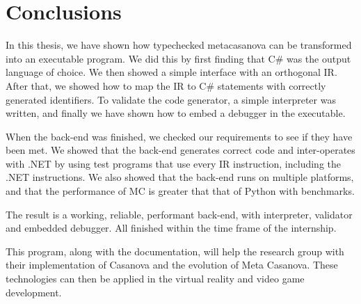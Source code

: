 \section{Conclusions}\label{conclusions}
In this thesis, we have shown how typechecked metacasanova can be transformed into an executable program.
We did this by first finding that C\# was the output language of choice.
We then showed a simple interface with an orthogonal IR.
After that, we showed how to map the IR to C\# statements with correctly generated identifiers.
To validate the code generator, a simple interpreter was written, and finally we have shown how to embed a debugger in the executable.

When the back-end was finished, we checked our requirements to see if they have been met.
We showed that the back-end generates correct code and inter-operates with .NET by using test programs that use every IR instruction, including the .NET instructions.
We also showed that the back-end runs on multiple platforms, and that the performance of MC is greater that that of Python with benchmarks.

The result is a working, reliable, performant back-end, with interpreter, validator and embedded debugger.
All finished within the time frame of the internship.

This program, along with the documentation, will help the research group with their implementation of Casanova and the evolution of Meta Casanova.
These technologies can then be applied in the virtual reality and video game development.
